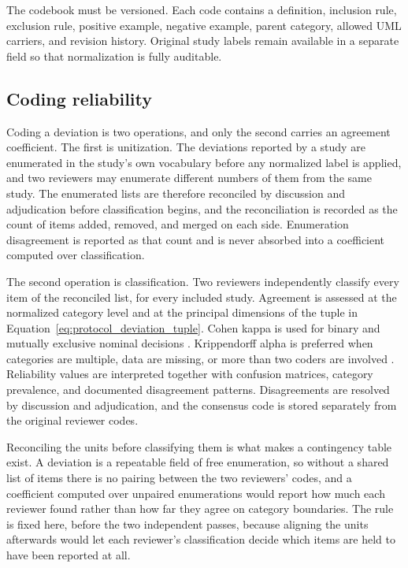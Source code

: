 The codebook must be versioned. Each code contains a definition, inclusion rule, exclusion rule, positive example, negative example, parent category, allowed UML carriers, and revision history. Original study labels remain available in a separate field so that normalization is fully auditable.

\subsection{Coding reliability}

Coding a deviation is two operations, and only the second carries an agreement coefficient. The first is unitization. The deviations reported by a study are enumerated in the study's own vocabulary before any normalized label is applied, and two reviewers may enumerate different numbers of them from the same study. The enumerated lists are therefore reconciled by discussion and adjudication before classification begins, and the reconciliation is recorded as the count of items added, removed, and merged on each side. Enumeration disagreement is reported as that count and is never absorbed into a coefficient computed over classification.

The second operation is classification. Two reviewers independently classify every item of the reconciled list, for every included study. Agreement is assessed at the normalized category level and at the principal dimensions of the tuple in Equation~\ref{eq:protocol_deviation_tuple}. Cohen kappa is used for binary and mutually exclusive nominal decisions \cite{Cohen1960Kappa}. Krippendorff alpha is preferred when categories are multiple, data are missing, or more than two coders are involved \cite{Krippendorff2018Content}. Reliability values are interpreted together with confusion matrices, category prevalence, and documented disagreement patterns. Disagreements are resolved by discussion and adjudication, and the consensus code is stored separately from the original reviewer codes.

Reconciling the units before classifying them is what makes a contingency table exist. A deviation is a repeatable field of free enumeration, so without a shared list of items there is no pairing between the two reviewers' codes, and a coefficient computed over unpaired enumerations would report how much each reviewer found rather than how far they agree on category boundaries. The rule is fixed here, before the two independent passes, because aligning the units afterwards would let each reviewer's classification decide which items are held to have been reported at all.

